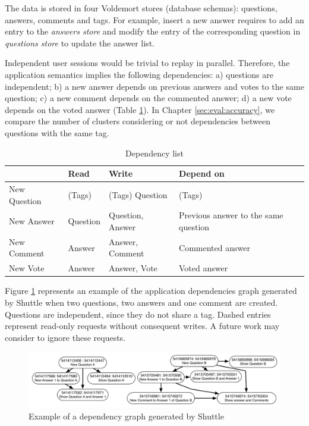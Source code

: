 The data is stored in four Voldemort stores (database schemas): questions, answers, comments and tags. For example, insert a new answer requires to add an entry to the \textit{answers store} and modify the entry of the corresponding question in \textit{questions store} to update the answer list. 

Independent user sessions would be trivial to replay in parallel. Therefore, the application semantics implies the following dependencies: a) questions are independent; b) a new answer depends on previous answers and votes to the same question; c) a new comment depends on the commented answer; d) a new vote depends on the voted answer (Table \ref{tab:dependencyTable}). In Chapter \ref{sec:eval:accuracy}, we compare the number of clusters considering or not dependencies between questions with the same tag.
\begin{table}
  \centering
   \begin{tabular}{l|l|l|l}
    ~             & \textbf{Read}   & \textbf{Write}   & \textbf{Depend on} 					 \\ \hline
    New Question  & (Tags)          & (Tags) Question  & (Tags)                                  \\ \hline
    New Answer    & Question        & Question, Answer & Previous answer to the same question     \\ \hline
    New Comment   & Answer          & Answer, Comment  & Commented answer                            \\ \hline
    New Vote      & Answer          & Answer, Vote     & Voted answer                               \\
    \end{tabular}
    \caption{Dependency list}
    \label{tab:dependencyTable}
\end{table}

Figure \ref{fig:dependencyGraph} represents an example of the application dependencies graph generated by Shuttle when two questions, two answers and one comment are created. Questions are independent, since they do not share a tag. Dashed entries represent read-only requests without consequent writes. A future work may consider to ignore these requests.

\begin{figure}
  \centering
  \includegraphics[width=150mm]{images/dependencyGraph}
  \caption{Example of a dependency graph generated by Shuttle}
  \label{fig:dependencyGraph}
\end{figure}

